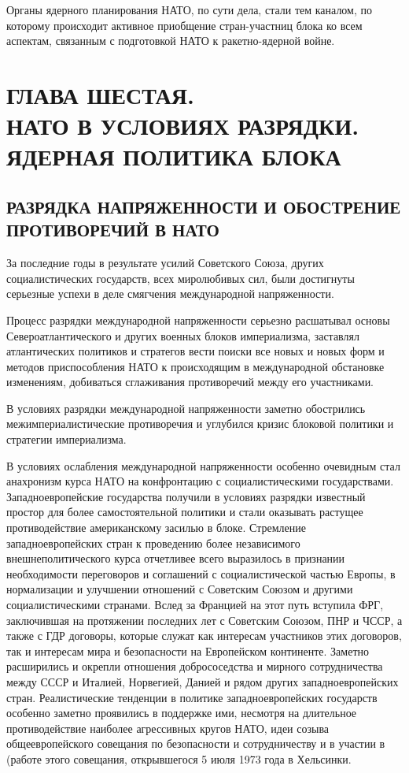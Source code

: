 \documentclass[12pt, a4paper, openany]{book}
\begin{document}
	Органы ядерного планирования НАТО, по сути дела, стали тем каналом, по которому происходит активное приобщение стран-участниц блока ко всем аспектам, связанным с подготовкой НАТО к ракетно-ядерной войне.
	
					\newpage
	\section[Глава шестая. НАТО В УСЛОВИЯХ РАЗРЯДКИ. ЯДЕРНАЯ ПОЛИТИКА БЛОКА]{\center ГЛАВА ШЕСТАЯ.\\ \textbf{НАТО В УСЛОВИЯХ РАЗРЯДКИ. ЯДЕРНАЯ ПОЛИТИКА БЛОКА}}	
	\subsection[Разрядка напряженности и обострение противоречий в НАТО]{\center РАЗРЯДКА НАПРЯЖЕННОСТИ И ОБОСТРЕНИЕ ПРОТИВОРЕЧИЙ В НАТО}	
	
	
За последние годы в результате усилий Советского Союза, других социалистических государств, всех миролюбивых сил, были достигнуты серьезные успехи в деле смягчения международной напряженности.
	
Процесс разрядки международной напряженности серьезно расшатывал основы Североатлантического и других военных блоков империализма, заставлял атлантических политиков и стратегов вести поиски все новых и новых форм и методов приспособления НАТО к происходящим в международной обстановке изменениям, добиваться сглаживания противоречий между его участниками.
	
В условиях разрядки международной напряженности заметно обострились межимпериалистические противоречия и углубился кризис блоковой политики и стратегии империализма.
	
В условиях ослабления международной напряженности особенно очевидным стал анахронизм курса НАТО на конфронтацию с социалистическими государствами. Западноевропейские государства получили в условиях разрядки известный простор для более самостоятельной политики и стали оказывать растущее противодействие американскому засилью в блоке. Стремление западноевропейских стран к проведению более независимого внешнеполитического курса отчетливее всего выразилось в признании необходимости переговоров и соглашений с социалистической частью Европы, в нормализации и улучшении отношений с Советским Союзом и другими социалистическими странами. Вслед за Францией на этот путь вступила ФРГ, заключившая на протяжении последних лет с Советским Союзом, ПНР и ЧССР, а также с ГДР договоры, которые служат как интересам участников этих договоров, так и интересам мира и безопасности на Европейском континенте. Заметно расширились и окрепли отношения добрососедства и мирного сотрудничества между СССР и Италией, Норвегией, Данией и рядом других западноевропейских стран. Реалистические тенденции в политике западноевропейских государств особенно заметно проявились в поддержке ими, несмотря на длительное противодействие наиболее агрессивных кругов НАТО, идеи созыва общеевропейского совещания по безопасности и сотрудничеству и в участии в (работе этого совещания, открывшегося 5 июля 1973 года в Хельсинки.
	
\end{document}
